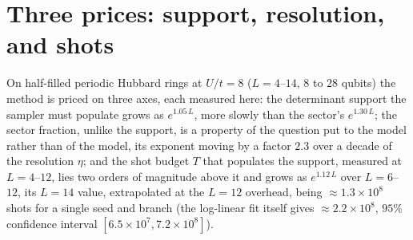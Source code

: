 %
%

\section{Three prices: support, resolution, and shots}\label{sec:prices}

On half-filled periodic Hubbard rings at $U/t=8$ ($L=4$--$14$, $8$ to $28$ qubits) the method is
priced on three axes, each measured here: the determinant support the sampler must populate grows
as $e^{1.05\,L}$, more slowly than the sector's $e^{1.30\,L}$; the sector fraction, unlike the
support, is a property of the question put to the model rather than of the model, its exponent
moving by a factor $2.3$ over a decade of the resolution $\eta$; and the shot budget $T$ that
populates the support, measured at $L=4$--$12$, lies two orders of magnitude above it and grows as
$e^{1.12\,L}$ over $L=6$--$12$, its $L=14$ value, extrapolated at the $L=12$ overhead, being
${\approx}1.3\times10^{8}$ shots for a single seed and branch (the log-linear fit itself gives
${\approx}2.2\times10^{8}$, $95\%$ confidence interval $[6.5\times10^{7},7.2\times10^{8}]$).
%
%
%
%
%
%
%
%
%
%
%
%
%
%
%
%
%
%

